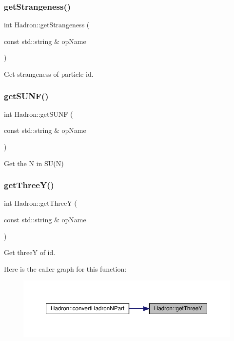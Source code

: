 \subsubsection{\texorpdfstring{getStrangeness()}{getStrangeness()}}
{\footnotesize\ttfamily int Hadron\+::get\+Strangeness (\begin{DoxyParamCaption}\item[{const std\+::string \&}]{op\+Name }\end{DoxyParamCaption})}



Get strangeness of particle id. 

\mbox{\label{namespaceHadron_a61e330de82814218612462c430ceaeb9}} 
\subsubsection{\texorpdfstring{getSUNF()}{getSUNF()}}
{\footnotesize\ttfamily int Hadron\+::get\+S\+U\+NF (\begin{DoxyParamCaption}\item[{const std\+::string \&}]{op\+Name }\end{DoxyParamCaption})}



Get the N in S\+U(\+N) 

\mbox{\label{namespaceHadron_a8739169b4caffa5f8bab802592b3302a}} 
\subsubsection{\texorpdfstring{getThreeY()}{getThreeY()}}
{\footnotesize\ttfamily int Hadron\+::get\+ThreeY (\begin{DoxyParamCaption}\item[{const std\+::string \&}]{op\+Name }\end{DoxyParamCaption})}



Get threeY of id. 

Here is the caller graph for this function\+:
\nopagebreak
\begin{figure}[H]
\begin{center}
\leavevmode
\includegraphics[width=350pt]{d1/daf/namespaceHadron_a8739169b4caffa5f8bab802592b3302a_icgraph}
\end{center}
\end{figure}
\mbox{\label{namespaceHadron_a660c9f3adc1525c9d326b23398d09494}} 
